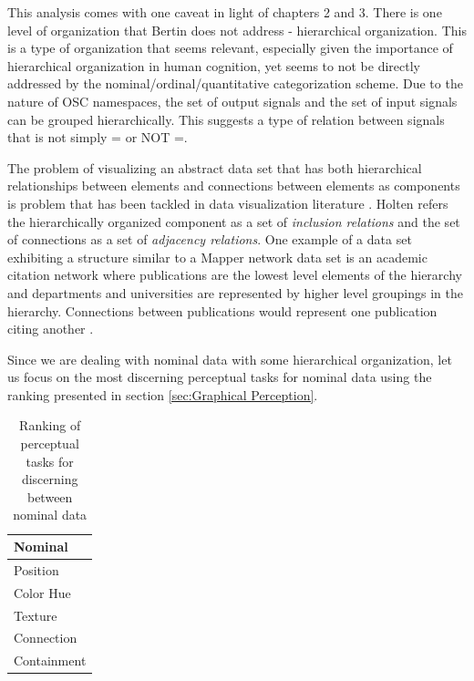 This analysis comes with one caveat in light of chapters 2 and 3. There is one level of organization that Bertin does not address - hierarchical organization. This is a type of organization that seems relevant, especially given the importance of hierarchical organization in human cognition, yet seems to not be directly addressed by the nominal/ordinal/quantitative categorization scheme. Due to the nature of OSC namespaces, the set of output signals and the set of input signals can be grouped hierarchically. This suggests a type of relation between signals that is not simply = or NOT =.

The problem of visualizing an abstract data set that has both hierarchical relationships between elements and connections between elements as components is problem that has been tackled in data visualization literature \cite{edgebundles2006}. Holten refers the hierarchically organized component as a set of \emph{inclusion relations} and the set of connections as a set of \emph{adjacency relations}. One example of a data set exhibiting a structure similar to a Mapper network data set is an academic citation network where publications are the lowest level elements of the hierarchy and departments and universities are represented by higher level groupings in the hierarchy. Connections between publications would represent one publication citing another \cite{edgebundles2006}.

Since we are dealing with nominal data with some hierarchical organization, let us focus on the most discerning perceptual tasks for nominal data using the ranking presented in section \ref{sec:Graphical Perception}.

\begin{table}
    \begin{center}
    \begin{tabular}{ | l | }
    \hline
    Nominal \\ \hline
    Position \\
    Color Hue \\
    Texture \\
    Connection \\
    Containment \\
    \hline
    \end{tabular}
    \end{center}
    \caption{Ranking of perceptual tasks for discerning between nominal data \cite{jock1986}}
    \label{tab:perceptualNominal}
\end{table}

